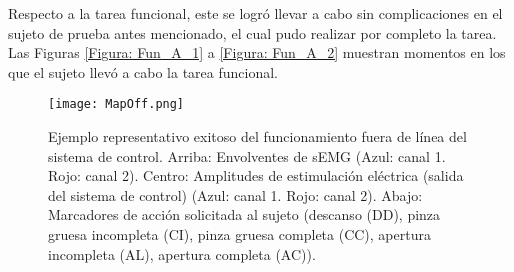 Respecto a la tarea funcional, este se logró llevar a cabo sin complicaciones en el sujeto de prueba antes mencionado, el cual pudo realizar por completo la tarea. Las Figuras \ref{Figura: Fun_A_1} a \ref{Figura: Fun_A_2} muestran momentos en los que el sujeto llevó a cabo la tarea funcional.


\begin{figure}[htbp]
	\centering
	\texttt{[image: MapOff.png]}
	\caption[Ejemplo representativo exitoso del funcionamiento fuera de línea del sistema de control]{Ejemplo representativo exitoso del funcionamiento fuera de línea del sistema de control. Arriba: Envolventes de sEMG (Azul: canal 1. Rojo: canal 2). Centro: Amplitudes de estimulación eléctrica (salida del sistema de control) (Azul: canal 1. Rojo: canal 2). Abajo: Marcadores de acción solicitada al sujeto (descanso (DD), pinza gruesa incompleta (CI), pinza gruesa completa (CC), apertura incompleta (AL), apertura completa (AC)).}
	\label{Figura: MapOff}
\end{figure}


